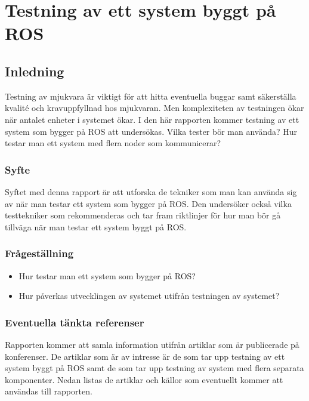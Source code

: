 \chapter{Testning av ett system byggt på ROS}
\label{cha:indiv-report-holmberg}

\section{Inledning}
\label{sec:introduction-holmberg}

Testning av mjukvara är viktigt för att hitta eventuella buggar samt säkerställa kvalité och kravuppfyllnad hos mjukvaran. Men komplexiteten av testningen ökar när antalet enheter i systemet ökar. I den här rapporten kommer testning av ett system som bygger på ROS att undersökas. Vilka tester bör man använda? Hur testar man ett system med flera noder som kommunicerar?

\subsection{Syfte}
\label{sec:purpose-holmberg}

Syftet med denna rapport är att utforska de tekniker som man kan använda sig av när man testar ett system som bygger på ROS. Den undersöker också vilka testtekniker som rekommenderas och tar fram riktlinjer för hur man bör gå tillväga när man testar ett system byggt på ROS.

\subsection{Frågeställning}
\label{sec:issue-holmberg}

\begin{itemize}
	\item Hur testar man ett system som bygger på ROS?
	\item Hur påverkas utvecklingen av systemet utifrån testningen av systemet?
\end{itemize}

\subsection{Eventuella tänkta referenser}

Rapporten kommer att samla information utifrån artiklar som är publicerade på konferenser. De artiklar som är av intresse är de som tar upp testning av ett system byggt på ROS samt de som tar upp testning av system med flera separata komponenter. Nedan listas de artiklar och källor som eventuellt kommer att användas till rapporten.

